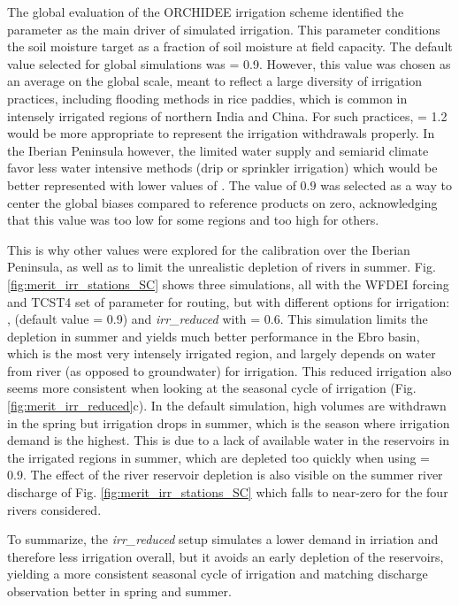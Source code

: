 The global evaluation of the ORCHIDEE irrigation scheme \citep{arboleda-obando_validation_2024} identified the \betairrig parameter as the main driver of simulated irrigation. This parameter conditions the soil moisture target as a fraction of soil moisture at field capacity. The default value selected for global simulations was \betairrig = 0.9. However, this value was chosen as an average on the global scale, meant to reflect a large diversity of irrigation practices, including flooding methods in rice paddies, which is common in intensely irrigated regions of northern India and China. For such practices, \betairrig = 1.2 would be more appropriate to represent the irrigation withdrawals properly. In the Iberian Peninsula however, the limited water supply and semiarid climate favor less water intensive methods (drip or sprinkler irrigation) which would be better represented with lower values of \betairrig. The value of $0.9$ was selected as a way to center the global biases compared to reference products on zero, acknowledging that this value was too low for some regions and too high for others.

This is why other values were explored for the calibration over the Iberian Peninsula, as well as to limit the unrealistic depletion of rivers in summer. Fig. \ref{fig:merit_irr_stations_SC} shows three simulations, all with the WFDEI forcing and TCST4 set of parameter for routing, but with different options for irrigation: \noirr, \irr (default value \betairrig = 0.9) and \textit{irr\_reduced} with \betairrig = 0.6. 
This simulation limits the depletion in summer and yields much better performance in the Ebro basin, which is the most very intensely irrigated region, and largely depends on water from river (as opposed to groundwater) for irrigation.
This reduced irrigation also seems more consistent when looking at the seasonal cycle of irrigation (Fig. \ref{fig:merit_irr_reduced}c). In the default \irr simulation, high volumes are withdrawn in the spring but irrigation drops in summer, which is the season where irrigation demand is the highest. This is due to a lack of available water in the reservoirs in the irrigated regions in summer, which are depleted too quickly when using \betairrig = 0.9. The effect of the river reservoir depletion is also visible on the summer river discharge of Fig. \ref{fig:merit_irr_stations_SC} which falls to near-zero for the four rivers considered.

To summarize, the \textit{irr\_reduced} setup simulates a lower demand in irriation and therefore less irrigation overall, but it avoids an early depletion of the reservoirs, yielding a more consistent seasonal cycle of irrigation and matching discharge observation better in spring and summer.

